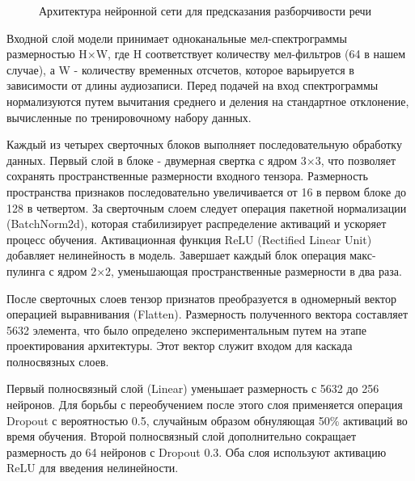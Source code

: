 \documentclass[oneside, final, 14pt]{extarticle}
\begin{document}
\begin{figure}[]
\caption{Архитектура нейронной сети для предсказания разборчивости речи}
\label{fig:nn_architecture}
\end{figure}


Входной слой модели принимает одноканальные мел-спектрограммы размерностью H×W, где H соответствует количеству мел-фильтров (64 в нашем случае), а W - количеству временных отсчетов, которое варьируется в зависимости от длины аудиозаписи. Перед подачей на вход спектрограммы нормализуются путем вычитания среднего и деления на стандартное отклонение, вычисленные по тренировочному набору данных.

Каждый из четырех сверточных блоков выполняет последовательную обработку данных. Первый слой в блоке - двумерная свертка с ядром 3×3, что позволяет сохранять пространственные размерности входного тензора. Размерность пространства признаков последовательно увеличивается от 16 в первом блоке до 128 в четвертом. За сверточным слоем следует операция пакетной нормализации (BatchNorm2d), которая стабилизирует распределение активаций и ускоряет процесс обучения. Активационная функция ReLU (Rectified Linear Unit) добавляет нелинейность в модель. Завершает каждый блок операция макс-пулинга с ядром 2×2, уменьшающая пространственные размерности в два раза.

После сверточных слоев тензор признатов преобразуется в одномерный вектор операцией выравнивания (Flatten). Размерность полученного вектора составляет 5632 элемента, что было определено экспериментальным путем на этапе проектирования архитектуры. Этот вектор служит входом для каскада полносвязных слоев.

Первый полносвязный слой (Linear) уменьшает размерность с 5632 до 256 нейронов. Для борьбы с переобучением после этого слоя применяется операция Dropout с вероятностью 0.5, случайным образом обнуляющая 50\% активаций во время обучения. Второй полносвязный слой дополнительно сокращает размерность до 64 нейронов с Dropout 0.3. Оба слоя используют активацию ReLU для введения нелинейности.
\end{document}
